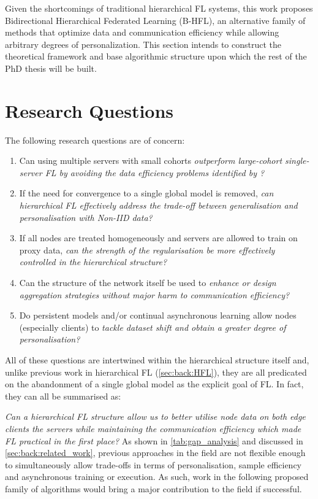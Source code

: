 
Given the shortcomings of traditional hierarchical FL systems, this work proposes Bidirectional Hierarchical Federated Learning (B-HFL), an alternative family of methods that optimize data and communication efficiency while allowing arbitrary degrees of personalization. This section intends to construct the theoretical framework and base algorithmic structure upon which the rest of the PhD thesis will be built.

\section{Research Questions}\label{sec:proposal:research_questions}
The following research questions are of concern:
\begin{enumerate}
    \item Can using multiple servers with small cohorts \emph{outperform large-cohort single-server FL by avoiding the data efficiency problems identified by \citet{LargeCohorts}?}
    \item If the need for convergence to a single global model is removed, \emph{can hierarchical FL effectively address the trade-off between generalisation and personalisation with Non-IID data?}
    \item If all nodes are treated homogeneously and servers are allowed to train on proxy data, \emph{can the strength of the regularisation be more effectively controlled in the hierarchical structure?}
    \item Can the structure of the network itself be used to \emph{enhance or design aggregation strategies without major harm to communication efficiency?}
    \item Do persistent models and/or continual asynchronous learning allow nodes (especially clients) to \emph{tackle dataset shift and obtain a greater degree of personalisation?}
\end{enumerate}
All of these questions are intertwined within the hierarchical structure itself and, unlike previous work in hierarchical FL (\cref{sec:back:HFL}), they are all predicated on the abandonment of a single global model as the explicit goal of FL\@. In fact, they can all be summarised as:

\emph{Can a hierarchical FL structure allow us to better utilise node data on both edge clients the servers while maintaining the communication efficiency which made FL practical in the first place?}
As shown in \cref{tab:gap_analysis} and discussed in \cref{sec:back:related_work}, previous approaches in the field are not flexible enough to simultaneously allow trade-offs in terms of personalisation, sample efficiency and asynchronous training or execution. As such, work in the following proposed family of algorithms would bring a major contribution to the field if successful.
